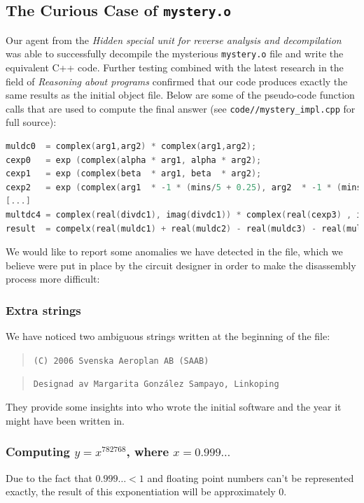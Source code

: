 \subsection{The Curious Case of \texttt{mystery.o}}

Our agent from the \emph{Hidden special unit for reverse analysis and decompilation} was able to successfully decompile the mysterious \texttt{mystery.o} file and write the equivalent C++ code. Further testing combined with the latest research in the field of \emph{Reasoning about programs} confirmed that our code produces exactly the same results as the initial object file. Below are some of the pseudo-code function calls that are used to compute the final answer (see \texttt{code//mystery\_impl.cpp} for full source):

\begin{lstlisting}[language=C++]
muldc0  = complex(arg1,arg2) * complex(arg1,arg2);
cexp0   = exp (complex(alpha * arg1, alpha * arg2);
cexp1   = exp (complex(beta  * arg1, beta  * arg2);
cexp2   = exp (complex(arg1  * -1 * (mins/5 + 0.25), arg2  * -1 * (mins/5 + 0.25)));
[...]
multdc4 = complex(real(divdc1), imag(divdc1)) * complex(real(cexp3) , imag(cexp3));
result  = compelx(real(muldc1) + real(muldc2) - real(muldc3) - real(muldc4), imag(muldc1) + imag(muldc2) - imag(muldc3) - imag(muldc4));

\end{lstlisting}

We would like to report some anomalies we have detected in the file, which we believe were put in place by the circuit designer in order to make the disassembly process more difficult:
\subsubsection{Extra strings}
We have noticed two ambiguous strings written at the beginning of the file:
\begin{quote}
\texttt{(C) 2006 Svenska Aeroplan AB (SAAB)}
\end{quote}
\begin{quote}
\texttt{Designad av Margarita Gonz\'{a}lez Sampayo, Linkoping}
\end{quote}
They provide some insights into who wrote the initial software and the year it might have been written in.
\subsubsection{Computing $y = x^{782768}$, where $x = 0.999 \ldots$}
Due to the fact that $0.999 \ldots < 1$ and floating point numbers can't be represented exactly, the result of this exponentiation will be approximately $0$.
